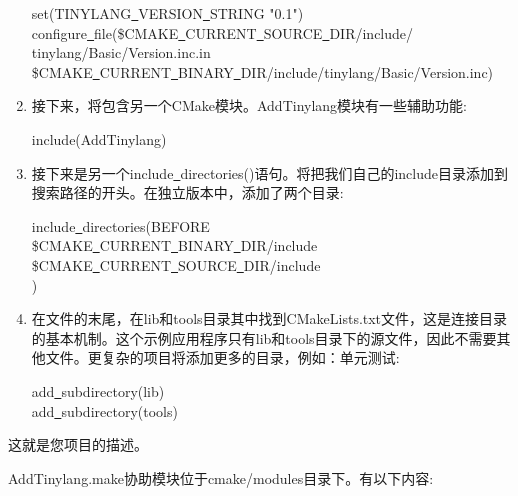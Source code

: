 \begin{enumerate}
 	\begin{tcolorbox}[colback=white,colframe=black]
 		set(TINYLANG\underline{~}VERSION\underline{~}STRING "0.1") \\
 		configure\underline{~}file(\${CMAKE\underline{~}CURRENT\underline{~}SOURCE\underline{~}DIR}/include/ \\
 		\hspace*{0.5cm}tinylang/Basic/Version.inc.in \\
 		  \${CMAKE\underline{~}CURRENT\underline{~}BINARY\underline{~}DIR}/include/tinylang/Basic/Version.inc)
 	\end{tcolorbox}
 	\item 接下来，将包含另一个CMake模块。AddTinylang模块有一些辅助功能:
 	\begin{tcolorbox}[colback=white,colframe=black]
 		include(AddTinylang)
 	\end{tcolorbox}
 	\item 接下来是另一个include\underline{~}directories()语句。将把我们自己的include目录添加到搜索路径的开头。在独立版本中，添加了两个目录:
 	\begin{tcolorbox}[colback=white,colframe=black]
 		include\underline{~}directories(BEFORE \\
 		\hspace*{0.5cm}\${CMAKE\underline{~}CURRENT\underline{~}BINARY\underline{~}DIR}/include \\
 		\hspace*{0.5cm}\${CMAKE\underline{~}CURRENT\underline{~}SOURCE\underline{~}DIR}/include \\
 		)
 	\end{tcolorbox}
 	\item 在文件的末尾，在lib和tools目录其中找到CMakeLists.txt文件，这是连接目录的基本机制。这个示例应用程序只有lib和tools目录下的源文件，因此不需要其他文件。更复杂的项目将添加更多的目录，例如：单元测试:
 	\begin{tcolorbox}[colback=white,colframe=black]
 		add\underline{~}subdirectory(lib) \\
 		add\underline{~}subdirectory(tools)
 	\end{tcolorbox}
\end{enumerate}

这就是您项目的描述。\par

AddTinylang.make协助模块位于cmake/modules目录下。有以下内容:\par

